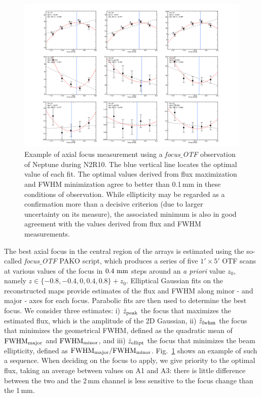 \begin{figure}[ht!]
\begin{center}
  \includegraphics[clip, angle=0, trim={1.5cm, 1cm, 1.5cm, 1cm}, width=\textwidth]{Figures/plot_20170419s143.png}
\caption[Axial focus measure]{Example of axial focus measurement using a
  \emph{focus$\_$OTF} observation of Neptune during N2R10. The blue vertical line
  locates the optimal value of each fit. The optimal values derived from flux
  maximization and FWHM minimization agree to better than 0.1\,mm in these
  conditions of observation. While ellipticity may be regarded as a confirmation
  more than a decisive criterion (due to larger uncertainty on its measure), the
  associated minimum is also in good agreement with the values derived from flux
  and FWHM measurements.}
\label{fig:focus-example}
\end{center}
\end{figure}

The best axial focus in the central region of the arrays is estimated using the
so-called \emph{focus$\_$OTF} PAKO script, which produces a series of five $1'
\times 5'$ OTF scans at various values of the focus in $0.4~\rm{mm}$ steps
around an \emph{a priori} value $z_0$, namely
$z \in \{-0.8, -0.4, 0, 0.4, 0.8\} + z_0$.
Elliptical Gaussian fits on the reconstructed maps provide estimates of
the flux and FWHM along minor - and major - axes for each focus. Parabolic fits are
then used to determine the best focus. We consider three estimates: i) $\hat
z_{\rm{peak}}$ the focus that maximizes the estimated flux, which is the
amplitude of the 2D Gaussian, ii) $\hat z_{\rm{fwhm}}$ the focus that minimizes
the geometrical FWHM, defined as the quadratic mean of $\rm{FWHM}_{\rm{major}}$
and $\rm{FWHM}_{\rm{minor}}$, and iii) $\hat z_{\rm{ellipt}}$ the focus that
minimizes the beam ellipticity, defined as
$\rm{FWHM}_{\rm{major}}/\rm{FWHM}_{\rm{minor}}$. Fig.~\ref{fig:focus-example}
shows an example of such a sequence. When deciding on the focus to apply, we
give priority to the optimal flux, taking an average between values on A1 and
A3: there is little difference between the two and the 2\,mm channel is
less sensitive to the focus change than the 1\,mm.

